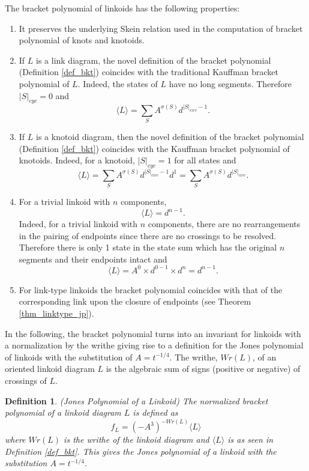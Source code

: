 \documentclass{article}
\newtheorem{definition}{Definition}[section]
\begin{document}
\noindent The bracket polynomial of linkoids  has the following properties:

\begin{enumerate}
    \item It preserves the underlying Skein relation used in the computation of bracket polynomial of knots and knotoids. 
    \item If $L$ is a link diagram, the novel definition of the bracket polynomial (Definition \ref{def_bkt}) coincides with the traditional Kauffman bracket polynomial of $L$. Indeed, the states of $L$ have no long segments. Therefore $|S|_{cyc} = 0$ and $$\langle L \rangle = \sum_S A^{\sigma (S)} d^{|S|_{circ} -1}.$$
    \item If $L$ is a knotoid diagram, then the novel definition of the bracket polynomial (Definition \ref{def_bkt}) coincides with the Kauffman bracket polynomial of knotoids. Indeed, for a knotoid, $|S|_{cyc}=1$ for all states and
    $$\langle L \rangle = \sum_S A^{\sigma (S)} d^{|S|_{circ} -1}d^1 =  \sum_S A^{\sigma (S)} d^{|S|_{circ}}.$$
    \item For a trivial linkoid with  $n$ components, $$\langle L \rangle = d^{n-1}. $$ Indeed, for a trivial linkoid with  $n$ components, there are no rearrangements in the pairing of endpoints since there are no crossings to be resolved. Therefore there is only 1 state in the state sum which has the original $n$ segments and their endpoints intact and $$\langle L \rangle = A^0 \times d^{0-1} \times d^{n} = d^{n-1}. $$
    \item For link-type linkoids the bracket polynomial coincides with that of the corresponding link upon the closure of endpoints (see Theorem \ref{thm_linktype_jp}).
\end{enumerate}


In the following, the bracket polynomial turns into an invariant for linkoids with a normalization by the writhe giving rise to a definition for the Jones polynomial of linkoids with the substitution of $A=t^{-1/4}$. The writhe,  $Wr(L)$, of an oriented linkoid diagram $L$ is the algebraic sum of signs (positive or negative) of crossings of $L$. 


\begin{definition}(Jones Polynomial of a Linkoid)
The normalized bracket polynomial of a linkoid diagram $L$ is defined as $$f_L = (-A^3) ^{-Wr(L)} \langle L \rangle$$
where  $Wr(L)$ is the writhe of the linkoid diagram and $\langle L \rangle$ is as seen in Definition \ref{def_bkt}. This gives the Jones polynomial of a linkoid with the substitution $A=t^{-1/4}$.
\label{def_jones}
\end{definition}
\end{document}
